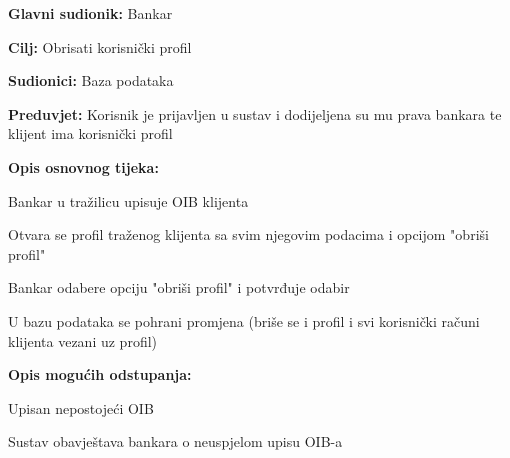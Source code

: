                 
                
                \noindent {}
                \begin{packed_item}
                
                  \item \textbf{Glavni sudionik: }Bankar
                  \item  \textbf{Cilj:} Obrisati korisnički profil 
                  \item  \textbf{Sudionici:} Baza podataka
                  \item  \textbf{Preduvjet:} Korisnik je prijavljen u sustav i dodijeljena su mu prava bankara te klijent ima korisnički profil
                  \item  \textbf{Opis osnovnog tijeka:}
              
              \item[] \begin{packed_enum}
                
                    \item  Bankar u tražilicu upisuje OIB klijenta
                    \item  Otvara se profil traženog klijenta sa svim njegovim podacima i opcijom "obriši profil"
                    \item  Bankar odabere opciju "obriši profil" i potvrđuje odabir
                    \item  U bazu podataka se pohrani promjena (briše se i profil i svi korisnički računi klijenta vezani uz profil)
                  \end{packed_enum}
                  
                  \item  \textbf{Opis mogućih odstupanja:}
                  
                  \item[] \begin{packed_enum}
                
                    \item[1.a] Upisan nepostojeći OIB
                    \item[] \begin{packed_enum}
                      
                      \item Sustav obavještava bankara o neuspjelom upisu OIB-a 
                    
                  \end{packed_enum}
                \end{packed_enum}
            \end{packed_item}
        

